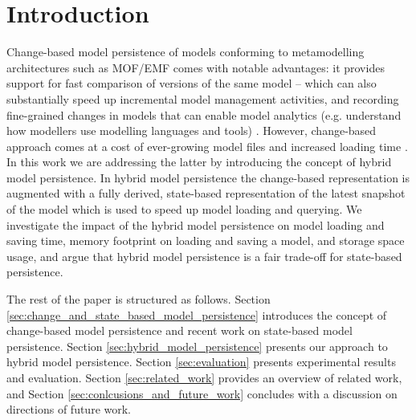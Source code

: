 \documentclass[10pt,conference]{IEEEtran}
\begin{document}
\section{Introduction}
\label{sec:introduction}
Change-based model persistence of models conforming to metamodelling architectures such as MOF/EMF \cite{DBLP:conf/models/YohannisKP17} comes with notable advantages: it provides support for fast comparison of versions of the same model \cite{DBLP:conf/sde/LippeO92,DBLP:conf/caise/IgnatN05,DBLP:conf/edoc/KoegelHLHD10,koegel2010emfstore}  -- which can also substantially speed up incremental model management activities, and recording fine-grained changes in models that can enable model analytics (e.g. understand how modellers use modelling languages and tools) \cite{DBLP:journals/entcs/RobbesL07}. However, change-based approach comes at a cost of ever-growing model files \cite{DBLP:conf/edoc/KoegelHLHD10,DBLP:journals/entcs/RobbesL07} and increased loading time \cite{mens2002state}. In this work we are addressing the latter by introducing the concept of hybrid model persistence. In hybrid model persistence the change-based representation is augmented with a fully derived, state-based representation of the latest snapshot of the model which is used to speed up model loading and querying. We investigate the impact of the hybrid model persistence on model loading and saving time, memory footprint on loading and saving a model, and storage space usage, and argue that hybrid model persistence is a fair trade-off for state-based persistence.
 
The rest of the paper is structured as follows. Section \ref{sec:change_and_state_based_model_persistence} introduces the concept of change-based model persistence and recent work on state-based model persistence. Section \ref{sec:hybrid_model_persistence} presents our approach to hybrid model persistence. Section \ref{sec:evaluation} presents experimental results and evaluation. Section \ref{sec:related_work} provides an overview of related work, and Section \ref{sec:conlcusions_and_future_work} concludes with a discussion on directions of future work.
\end{document}
